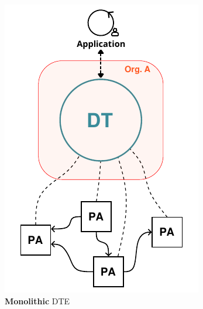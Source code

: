 \begin{figure}[t]
    \centering
    \begin{subfigure}[b]{0.3\linewidth}
        \centering
        \includegraphics[width=\linewidth]{figures/hwodt/ecosystems_types-monolithic.pdf}
        \caption{\textbf{Monolithic} \ac{DTE}}
        \label{fig:ecosystem-monolithic}
    \end{subfigure}
    \hfill
    \begin{subfigure}[b]{0.3\linewidth}
        \centering

\end{subfigure}
\end{figure}
